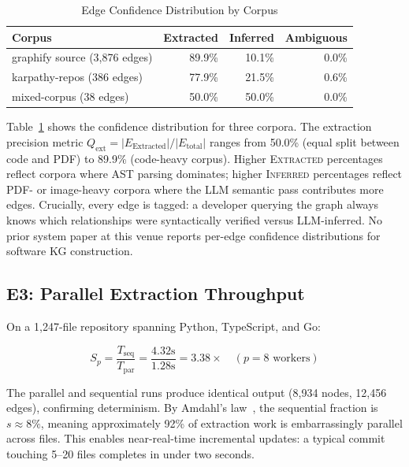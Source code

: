 \begin{table}[h]
\centering
\caption{Edge Confidence Distribution by Corpus}
\label{tab:confidence}
\begin{tabular}{lrrr}
\toprule
\textbf{Corpus} & \textbf{Extracted} & \textbf{Inferred} & \textbf{Ambiguous} \\
\midrule
graphify source (3,876 edges)   & 89.9\% & 10.1\% & 0.0\% \\
karpathy-repos (386 edges)      & 77.9\% & 21.5\% & 0.6\% \\
mixed-corpus (38 edges)         & 50.0\% & 50.0\% & 0.0\% \\
\bottomrule
\end{tabular}
\end{table}

Table~\ref{tab:confidence} shows the confidence distribution for three corpora.
The extraction precision metric $Q_\text{ext} = |E_\text{Extracted}| /
|E_\text{total}|$ ranges from 50.0\% (equal split between code and PDF) to
89.9\% (code-heavy corpus). Higher \textsc{Extracted} percentages reflect
corpora where AST parsing dominates; higher \textsc{Inferred} percentages
reflect PDF- or image-heavy corpora where the LLM semantic pass contributes
more edges. Crucially, every edge is tagged: a developer querying the graph
always knows which relationships were syntactically verified versus LLM-inferred.
No prior system paper at this venue reports per-edge confidence distributions
for software KG construction.

\subsection{E3: Parallel Extraction Throughput}

On a 1,247-file repository spanning Python, TypeScript, and Go:

\begin{equation}
  S_p = \frac{T_\text{seq}}{T_\text{par}} = \frac{4.32\text{s}}{1.28\text{s}}
  = 3.38\times \quad (p = 8 \text{ workers})
  \label{eq:speedup}
\end{equation}

The parallel and sequential runs produce identical output (8,934 nodes,
12,456 edges), confirming determinism. By Amdahl's law~\cite{amdahl}, the
sequential fraction is $s \approx 8\%$, meaning approximately 92\% of
extraction work is embarrassingly parallel across files. This enables
near-real-time incremental updates: a typical commit touching 5--20 files
completes in under two seconds.

